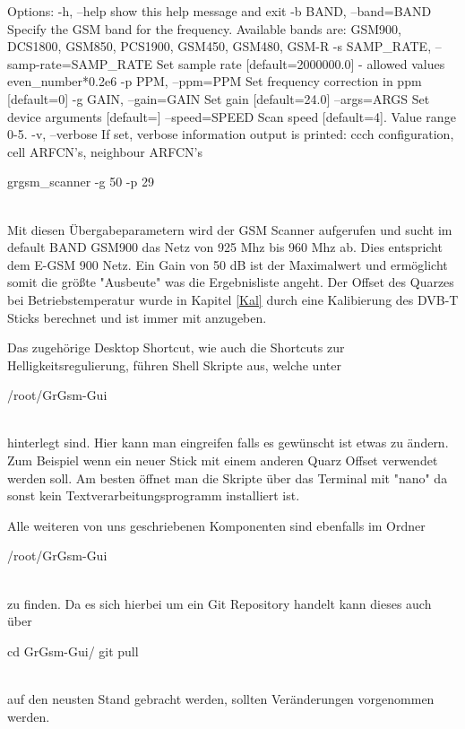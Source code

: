 \begin{code}
Options:
  -h, --help            show this help message and exit
  -b BAND, --band=BAND  Specify the GSM band for the frequency. Available
                        bands are: GSM900, DCS1800, GSM850, PCS1900, GSM450,
                        GSM480, GSM-R
  -s SAMP_RATE, --samp-rate=SAMP_RATE
                        Set sample rate [default=2000000.0] - allowed values
                        even_number*0.2e6
  -p PPM, --ppm=PPM     Set frequency correction in ppm [default=0]
  -g GAIN, --gain=GAIN  Set gain [default=24.0]
  --args=ARGS           Set device arguments [default=]
  --speed=SPEED         Scan speed [default=4]. Value range 0-5.
  -v, --verbose         If set, verbose information output is printed: ccch
                        configuration, cell ARFCN's, neighbour ARFCN's
                        
                   
grgsm_scanner -g 50 -p 29 
\end{code}
\noindent\\Mit diesen Übergabeparametern wird der \ac{GSM} Scanner aufgerufen und sucht im default BAND GSM900 das Netz von 925 Mhz bis 960 Mhz ab. Dies entspricht dem E-GSM 900 Netz. Ein Gain von 50 dB ist der Maximalwert und ermöglicht somit die größte "Ausbeute" was die Ergebnisliste angeht. Der Offset des Quarzes bei Betriebstemperatur wurde in Kapitel \ref{Kal} durch eine Kalibierung des DVB-T Sticks berechnet und ist immer mit anzugeben. 

Das zugehörige Desktop Shortcut, wie auch die Shortcuts zur Helligkeitsregulierung, führen Shell Skripte aus, welche unter 
\begin{code}
/root/GrGsm-Gui
\end{code}
\noindent\\hinterlegt sind. Hier kann man eingreifen falls es gewünscht ist etwas zu ändern. Zum Beispiel wenn ein neuer Stick mit einem anderen Quarz Offset verwendet werden soll. Am besten öffnet man die Skripte über das Terminal mit "nano" da sonst kein Textverarbeitungsprogramm installiert ist. 

Alle weiteren von uns geschriebenen Komponenten sind ebenfalls im Ordner 
\begin{code}
/root/GrGsm-Gui
\end{code}
\noindent\\zu finden. Da es sich hierbei um ein Git Repository handelt kann dieses auch über 
\begin{code}
cd GrGsm-Gui/
git pull
\end{code}
\noindent\\auf den neusten Stand gebracht werden, sollten Veränderungen vorgenommen werden. 

